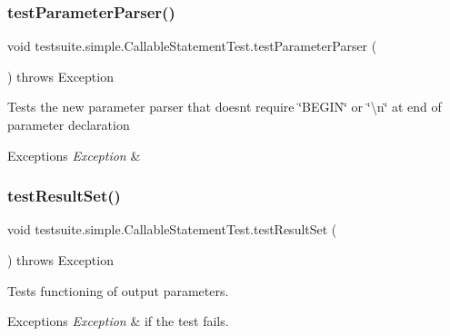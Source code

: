 \subsubsection{\texorpdfstring{test\+Parameter\+Parser()}{testParameterParser()}}
{\footnotesize\ttfamily void testsuite.\+simple.\+Callable\+Statement\+Test.\+test\+Parameter\+Parser (\begin{DoxyParamCaption}{ }\end{DoxyParamCaption}) throws Exception}

Tests the new parameter parser that doesn\textquotesingle{}t require \char`\"{}\+B\+E\+G\+I\+N\char`\"{} or \char`\"{}\textbackslash{}n\char`\"{} at end of parameter declaration


\begin{DoxyExceptions}{Exceptions}
{\em Exception} & \\
\hline
\end{DoxyExceptions}
\mbox{\label{classtestsuite_1_1simple_1_1_callable_statement_test_a8007b7089823f54d85bc02cf1c5427e8}} 
\subsubsection{\texorpdfstring{test\+Result\+Set()}{testResultSet()}}
{\footnotesize\ttfamily void testsuite.\+simple.\+Callable\+Statement\+Test.\+test\+Result\+Set (\begin{DoxyParamCaption}{ }\end{DoxyParamCaption}) throws Exception}

Tests functioning of output parameters.


\begin{DoxyExceptions}{Exceptions}
{\em Exception} & if the test fails. \\
\hline
\end{DoxyExceptions}
\mbox{\label{classtestsuite_1_1simple_1_1_callable_statement_test_ac41eeda6e62222c52818858c877b29f3}} 
